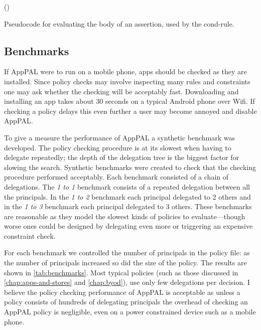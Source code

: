 \documentclass[thesis.tex]{subfiles}
\begin{document}
\begin{algorithm}
  \ContinuedFloat
  \Fn(){}{
  }
  \caption{Pseudocode for evaluating the body of an assertion, used by the cond-rule.}
\end{algorithm}



\subsection{Benchmarks}
\label{ssec:benchmarks}

If AppPAL were to run on a mobile phone, apps should be checked as they are installed.
Since policy checks may involve inspecting many rules and constraints one may ask whether the checking will be acceptably fast.
Downloading and installing an app takes about 30 seconds on a typical Android phone over Wifi.
If checking a policy delays this even further a user may become annoyed and disable AppPAL.

To give a measure the performance of AppPAL a synthetic benchmark was developed.
The policy checking procedure is at its slowest when having to delegate repeatedly;
the depth of the delegation tree is the biggest factor for slowing the search.
Synthetic benchmarks were created to check that the checking procedure performed acceptably.
Each benchmark consisted of a chain of delegations.
The \emph{1 to 1} benchmark consists of a repeated delegation between all the principals.
In the \emph{1 to 2} benchmark each principal delegated to 2 others and in the \emph{1 to 3} benchmark each principal delegated to 3 others.
These benchmarks are reasonable as they model the slowest kinds of policies to
evaluate---though worse ones could be designed by delegating even more or triggering an expensive constraint check.

For each benchmark we controlled the number of principals in the policy file:
as the number of principals increased so did the size of the policy.
The results are shown in \autoref{tab:benchmarks}.
Most typical policies (such as those discussed in \autoref{chap:apps-and-stores} and \autoref{chap:byod}), use only few delegations per decision.
I believe the policy checking performance of AppPAL is acceptable as unless a policy consists of hundreds of delegating principals the overhead of checking an AppPAL policy is negligible, even on a power constrained device such as a mobile phone.
\end{document}
